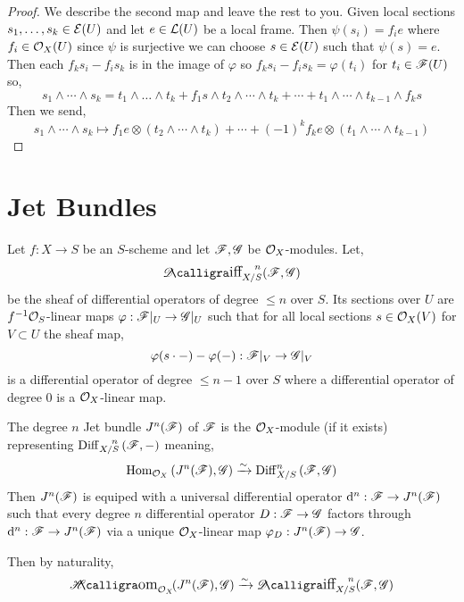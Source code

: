 \documentclass[12pt]{article}
\begin{document}
\begin{proof}
We describe the second map and leave the rest to you. Given local sections $s_1, \dots, s_k \in \mathcal{E}(U)$ and let $e \in \mathcal{L}(U)$ be a local frame. Then $\psi(s_i) = f_i e$ where $f_i \in \mathcal{O}_{X}(U)$ since $\psi$ is surjective we can choose $s \in \mathcal{E}(U)$ such that $\psi(s) = e$. Then each $f_k s_i - f_i s_k$ is in the image of $\varphi$ so $f_k s_i - f_i s_k = \varphi(t_i)$ for $t_i \in \mathscr{F}(U)$ so,
\[ s_1 \wedge \cdots \wedge s_k = t_1 \wedge \dots \wedge t_k + f_1 s \wedge t_2 \wedge \cdots \wedge t_k + \cdots + t_1 \wedge \cdots \wedge t_{k-1} \wedge f_k s \]
Then we send,
\[ s_1 \wedge \cdots \wedge s_k \mapsto f_1 e \otimes (t_2 \wedge \cdots \wedge t_k) + \cdots + (-1)^k f_k e \otimes (t_1 \wedge \cdots \wedge t_{k-1}) \]
\end{proof}

\section{Jet Bundles}


\begin{defn}
Let $f : X \to S$ be an $S$-scheme and let $\mathscr{F}, \mathscr{G}$ be $\mathcal{O}_{X}$-modules. Let,
\[ \shDiff{n}{X/S}{\F}{\G} \]
be the sheaf of differential operators of degree $\le n$ over $S$. Its sections over $U$ are $f^{-1} \mathcal{O}_{S}$-linear maps $\varphi : \mathscr{F}|_U \to \mathscr{G}|_U$ such that for all local sections $s \in \mathcal{O}_{X}(V)$ for $V \subset U$ the sheaf map,
\[ \varphi(s \cdot -) - \varphi(-) : \mathscr{F}|_V \to \mathscr{G}|_V \]
is a differential operator of degree $\le n - 1$ over $S$ where a differential operator of degree $0$ is a $\mathcal{O}_{X}$-linear map. 
\end{defn}

\begin{defn}
The degree $n$ Jet bundle $J^n(\mathscr{F})$ of $\mathscr{F}$ is the $\mathcal{O}_{X}$-module (if it exists) representing $\mathrm{Diff}^{\quad n}_{X/S}\left( \mathscr{F}, - \right)$ meaning,
\[ \mathrm{Hom}_{\mathcal{O}_{X}} \left( J^n(\mathscr{F}), \mathscr{G} \right) \xrightarrow{\sim} \mathrm{Diff}^{n}_{X/S}\left( \mathscr{F}, \mathscr{G} \right) \]
Then $J^n(\mathscr{F})$ is equiped with a universal differential operator $\mathrm{d}^n : \mathscr{F} \to J^n(\mathscr{F})$ such that every degree $n$ differential operator $D : \mathscr{F} \to \mathscr{G}$ factors through $\mathrm{d}^n : \mathscr{F} \to J^n(\mathscr{F})$ via a unique $\mathcal{O}_{X}$-linear map $\varphi_D : J^n(\mathscr{F}) \to \mathscr{G}$.
\end{defn}

\begin{rmk}
Then by naturality,
\[ \shHom{\struct{X}}{J^n(\F)}{\G} \iso \shDiff{n}{X/S}{\F}{\G} \]
\end{rmk}
\end{document}
